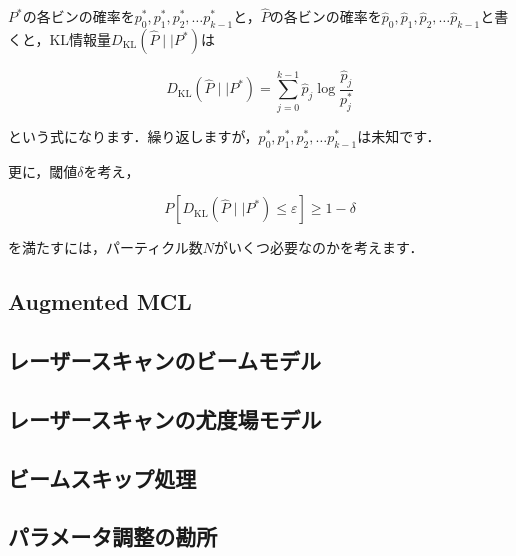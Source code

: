 \documentclass[{../../master}]{subfiles}
\begin{document}
$P^{*}$の各ビンの確率を$p^{*}_{0}, p^{*}_{1}, p^{*}_{2}, \ldots p^{*}_{k-1}$と，$\hat{P}$の各ビンの確率を$\hat{p}_{0}, \hat{p}_{1}, \hat{p}_{2}, \ldots \hat{p}_{k-1}$と書くと，KL情報量$D_{\text{KL}}(\hat{P} \mid\mid P^{*})$は

\begin{equation}
  D_{\text{KL}}(\hat{P} \mid\mid P^{*}) = \sum^{k-1}_{j=0} \hat{p}_{j}\log{\frac{\hat{p}_{j}}{p^{*}_j}}
\end{equation}

\noindent
という式になります．繰り返しますが，$p^{*}_{0}, p^{*}_{1}, p^{*}_{2}, \ldots p^{*}_{k-1}$は未知です．

更に，閾値$\delta$を考え，

\begin{equation}
  P[D_{\text{KL}}(\hat{P} \mid\mid P^{*}) \leq \varepsilon] \geq 1 - \delta
\end{equation}

\noindent
を満たすには，パーティクル数$N$がいくつ必要なのかを考えます．


\subsection{Augmented MCL}

\subsection{レーザースキャンのビームモデル}

\subsection{レーザースキャンの尤度場モデル}

\subsection{ビームスキップ処理}

\subsection{パラメータ調整の勘所}
\end{document}
